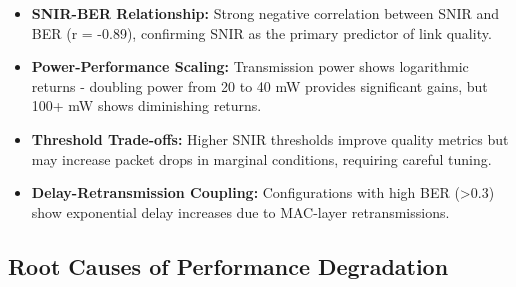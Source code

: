 \documentclass{article}
\begin{document}
\begin{itemize}

  \item \textbf{SNIR-BER Relationship:} Strong negative correlation between SNIR and BER (r = -0.89), confirming SNIR as the primary predictor of link quality.

  

  \item \textbf{Power-Performance Scaling:} Transmission power shows logarithmic returns - doubling power from 20 to 40 mW provides significant gains, but 100+ mW shows diminishing returns.

  

  \item \textbf{Threshold Trade-offs:} Higher SNIR thresholds improve quality metrics but may increase packet drops in marginal conditions, requiring careful tuning.

  

  \item \textbf{Delay-Retransmission Coupling:} Configurations with high BER (>0.3) show exponential delay increases due to MAC-layer retransmissions.

\end{itemize}

\subsection{Root Causes of Performance Degradation}
\end{document}

